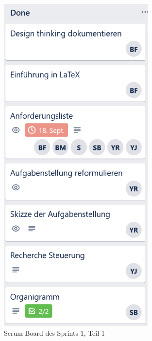     \begin{figure}[H]
  \centering
  \begin{minipage}[t]{0.45\linewidth}
  \includegraphics[width=0.7\textwidth]{img/Trello/Trello-Bord_1_Nr1.PNG}
  \caption{Scrum Board des Sprints 1, Teil 1}
  \label{Scrum Board 2.1}
  \end{minipage} 
  \hfill
  \begin{minipage}[t]{0.45\linewidth}

\end{minipage}
\end{figure}
